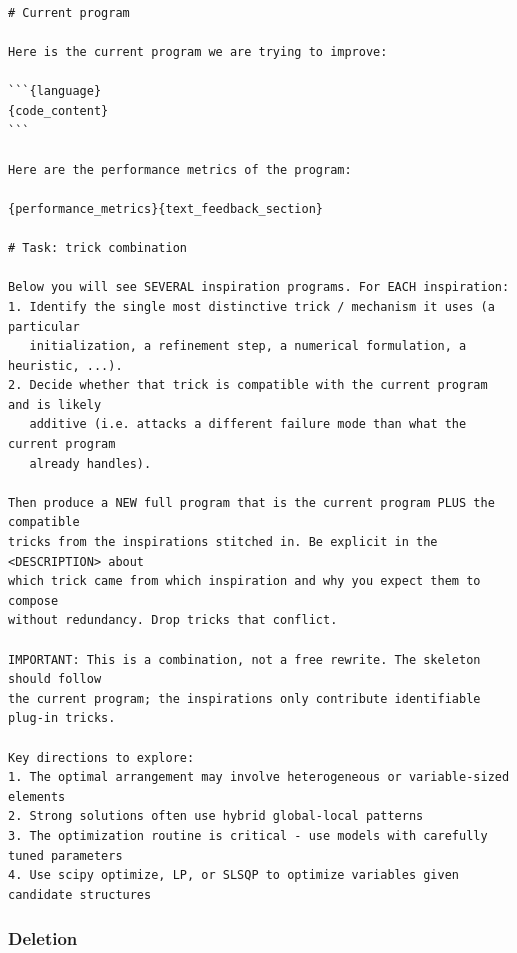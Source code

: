 \documentclass{llmxive}
\begin{document}
\begin{ttcolorbox}
\begin{lstlisting}[style=prompt]
# Current program

Here is the current program we are trying to improve:

```{language}
{code_content}
```

Here are the performance metrics of the program:

{performance_metrics}{text_feedback_section}

# Task: trick combination

Below you will see SEVERAL inspiration programs. For EACH inspiration:
1. Identify the single most distinctive trick / mechanism it uses (a particular
   initialization, a refinement step, a numerical formulation, a heuristic, ...).
2. Decide whether that trick is compatible with the current program and is likely
   additive (i.e. attacks a different failure mode than what the current program
   already handles).

Then produce a NEW full program that is the current program PLUS the compatible
tricks from the inspirations stitched in. Be explicit in the <DESCRIPTION> about
which trick came from which inspiration and why you expect them to compose
without redundancy. Drop tricks that conflict.

IMPORTANT: This is a combination, not a free rewrite. The skeleton should follow
the current program; the inspirations only contribute identifiable plug-in tricks.

Key directions to explore:
1. The optimal arrangement may involve heterogeneous or variable-sized elements
2. Strong solutions often use hybrid global-local patterns
3. The optimization routine is critical - use models with carefully tuned parameters
4. Use scipy optimize, LP, or SLSQP to optimize variables given candidate structures
\end{lstlisting}
\end{ttcolorbox}


\subsubsection{Deletion}
\label{app:prompts:del}
\end{document}
